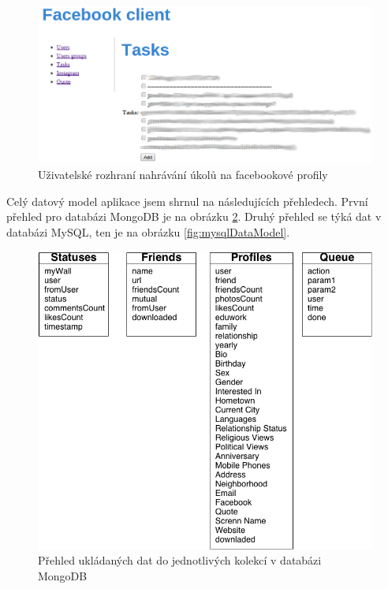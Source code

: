\documentclass[thesis=M,czech]{FITthesis}[2013/05/10]
\begin{document}
\begin{figure}[h]
\begin{center}
\includegraphics[width=5in]{figures/fcUserTask.png}
\caption{Uživatelské rozhraní nahrávání úkolů na facebookové profily}
\label{fig:fcUserTask}
\end{center}
\end{figure}

Celý datový model aplikace jsem shrnul na následujících přehledech. První přehled pro databázi MongoDB je na obrázku \ref{fig:mongoDataModel}. Druhý přehled se týká dat v databázi MySQL, ten je na obrázku \ref{fig:mysqlDataModel}.

\begin{figure}[h]
\begin{center}
\includegraphics[width=5in]{figures/mongoDataModel.png}
\caption{Přehled ukládaných dat do jednotlivých kolekcí v databázi MongoDB}
\label{fig:mongoDataModel}
\end{center}
\end{figure}
\end{document}
